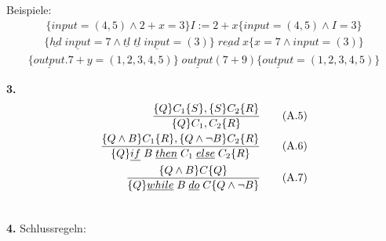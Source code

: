 \begin{compactitem}
		Beispiele:
		\begin{align*}
		\{input=(4,5)\land2+x=3\} I:=2+x \{input=(4,5)\land I=3\}
		\end{align*}
		\begin{align*}
		\{\underline{hd}\;\underline{input}=7 \land \underline{tl}\; \underline{tl}\;\underline{input}=(3) \}\;\underline{read}\; x \{x=7 \land input=(3)\}
		\end{align*}
		\begin{align*}
		\{\underline{output}.7+y=(1,2,3,4,5)\}\; \underline{output} (7+9) \{\underline{output} = (1,2,3,4,5)\}
		\end{align*}
	\item[\textbf{3.}]
	\begin{align}
	\frac{\{Q\}C_1\{S\},\{S\}C_2\{R\}}{\{Q\}C_1,C_2\{R\}}\tag{A.5}\\
	\frac{\{Q\land B\}C_1\{R\},\{Q\land \lnot B\}C_2\{R\}}{\{Q\}\underline{if}\;B\;\underline{then}\;C_1\;\underline{else}\;C_2\{R\}}\tag{A.6}\\
	\frac{\{Q\land B\}C\{Q\}}{\{Q\}\underline{while}\;B\;\underline{do}\;C\{Q\land \lnot B\}}\tag{A.7}\\
	\notag
	\end{align}
	\item[\textbf{4.}] Schlussregeln:\\
	
\end{compactitem}
